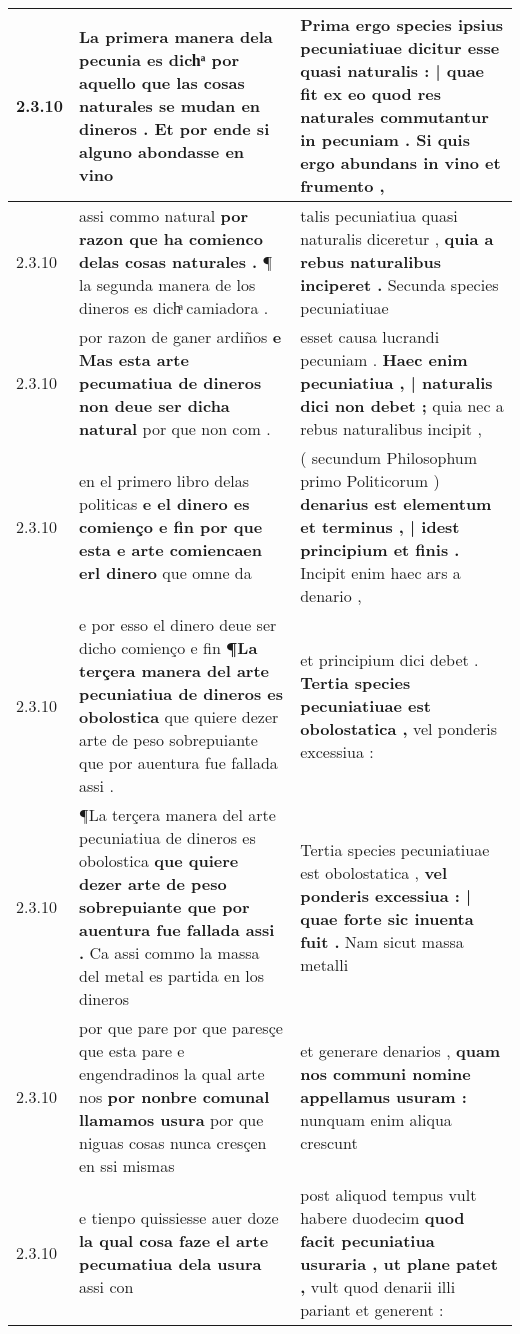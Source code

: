 \begin{tabular}{|p{1cm}|p{6.5cm}|p{6.5cm}|}
2.3.10 & La primera manera dela pecunia es dichͣ \textbf{ por aquello que las cosas naturales se mudan en dineros . } Et por ende si alguno abondasse en vino & Prima ergo species ipsius pecuniatiuae \textbf{ dicitur esse quasi naturalis : | quae fit ex eo quod res naturales commutantur in pecuniam . } Si quis ergo abundans in vino et frumento , \\\hline
2.3.10 & assi commo natural \textbf{ por razon que ha comienco delas cosas naturales . } ¶ la segunda manera de los dineros es dichͣ camiadora . & talis pecuniatiua quasi naturalis diceretur , \textbf{ quia a rebus naturalibus inciperet . } Secunda species pecuniatiuae \\\hline
2.3.10 & por razon de ganer ardiños \textbf{ e Mas esta arte pecumatiua de dineros non deue ser dicha natural } por que non com . & esset causa lucrandi pecuniam . \textbf{ Haec enim pecuniatiua , | naturalis dici non debet ; } quia nec a rebus naturalibus incipit , \\\hline
2.3.10 & en el primero libro delas politicas \textbf{ e el dinero es comienço e fin por que esta e arte comiencaen erl dinero } que omne da & ( secundum Philosophum primo Politicorum ) \textbf{ denarius est elementum et terminus , | idest principium et finis . } Incipit enim haec ars a denario , \\\hline
2.3.10 & e por esso el dinero deue ser dicho comienço e fin \textbf{ ¶La terçera manera del arte pecuniatiua de dineros es obolostica } que quiere dezer arte de peso sobrepuiante que por auentura fue fallada assi . & et principium dici debet . \textbf{ Tertia species pecuniatiuae est obolostatica , } vel ponderis excessiua : \\\hline
2.3.10 & ¶La terçera manera del arte pecuniatiua de dineros es obolostica \textbf{ que quiere dezer arte de peso sobrepuiante que por auentura fue fallada assi . } Ca assi commo la massa del metal es partida en los dineros & Tertia species pecuniatiuae est obolostatica , \textbf{ vel ponderis excessiua : | quae forte sic inuenta fuit . } Nam sicut massa metalli \\\hline
2.3.10 & por que pare por que paresçe que esta pare e engendradinos la qual arte nos \textbf{ por nonbre comunal llamamos usura } por que niguas cosas nunca cresçen en ssi mismas & et generare denarios , \textbf{ quam nos communi nomine appellamus usuram : } nunquam enim aliqua crescunt \\\hline
2.3.10 & e tienpo quissiesse auer doze \textbf{ la qual cosa faze el arte pecumatiua dela usura } assi con & post aliquod tempus vult habere duodecim \textbf{ quod facit pecuniatiua usuraria , ut plane patet , } vult quod denarii illi pariant et generent : \\\hline

\end{tabular}
